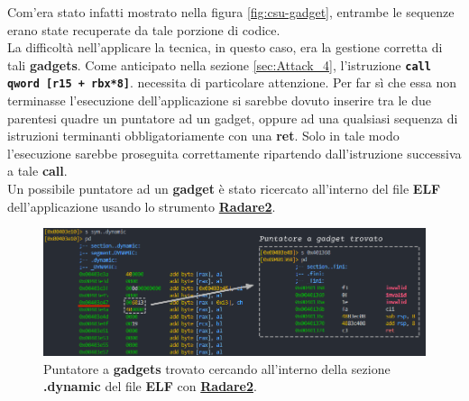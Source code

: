 Com'era stato infatti mostrato nella figura \ref{fig:csu-gadget}, entrambe le sequenze erano state recuperate da tale porzione di codice.\\
La difficoltà nell'applicare la tecnica, in questo caso, era la gestione corretta di tali \textbf{gadgets}. Come anticipato nella sezione \ref{sec:Attack_4}, l'istruzione \texttt{\textbf{call qword [r15 + rbx*8]}}. necessita di particolare attenzione. Per far sì che essa non terminasse l'esecuzione dell'applicazione
si sarebbe dovuto inserire tra le due parentesi quadre un puntatore ad un gadget, oppure ad una qualsiasi sequenza di istruzioni terminanti obbligatoriamente con una \textbf{ret}. Solo in tale modo l'esecuzione sarebbe proseguita correttamente ripartendo dall'istruzione successiva a tale \textbf{call}.\\
Un possibile puntatore ad un \textbf{gadget} è stato ricercato all'interno del file \textbf{ELF} dell'applicazione usando lo strumento \hyperref[Radare2]{\textbf{Radare2}}.
\begin{figure}[htbp]
      \centering
      \includegraphics[width=1\textwidth]{images/puntatore a gadget.png}
      \caption{Puntatore a \textbf{gadgets} trovato cercando all'interno della sezione \textbf{.dynamic} del file \textbf{ELF} con \hyperref[Radare2]{\textbf{Radare2}}.}\label{fig:pointer-gadget}
\end{figure}

